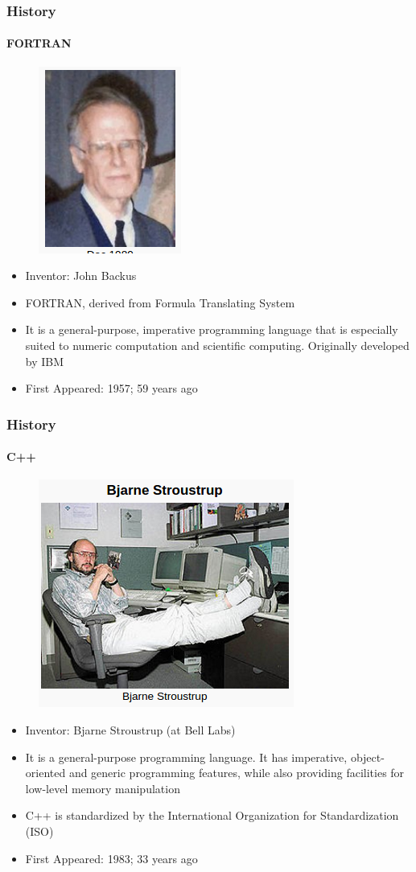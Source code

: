 \documentclass[hyperref={pdfpagelabels=true}]{beamer}
\begin{document}
\begin{frame}
\frametitle{History}
\framesubtitle{FORTRAN}
\begin{figure}[!tbp]
\centering
\includegraphics[scale = 0.35]{figs/Selection_007.png}
\end{figure}
\begin{itemize}
\item Inventor: John Backus
\item[\ding{45}]  FORTRAN, derived from Formula Translating System
\item It is a general-purpose, imperative programming language that is especially suited to numeric computation and scientific computing. Originally developed by IBM
\item First Appeared: 1957; 59 years ago
\end{itemize}
\end{frame}

\begin{frame}
\frametitle{History}
\framesubtitle{C++}
\begin{figure}[!tbp]
\centering
\includegraphics[scale = 0.35]{figs/cpr.png}
\end{figure}
\scriptsize{
\begin{itemize}
\item Inventor: Bjarne Stroustrup (at Bell Labs)
\item It is a general-purpose programming language. It has imperative, object-oriented and generic programming features, while also providing facilities for low-level memory manipulation
\item C++ is standardized by the International Organization for Standardization (ISO)
\item First Appeared: 1983; 33 years ago
\end{itemize}}
\end{frame}
\end{document}
